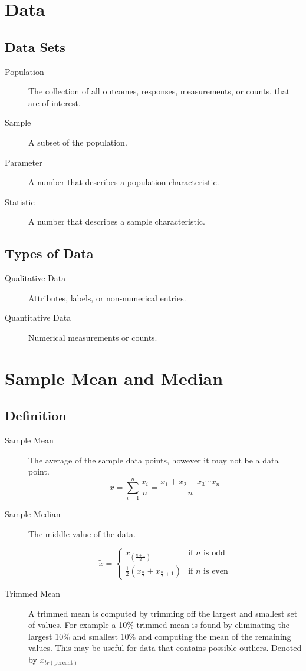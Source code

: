 \documentclass{book}
\begin{document}
\section{Data}

\subsection{Data Sets}
\begin{description}
\item[Population] The collection of all outcomes, responses, measurements, or counts, that are of interest.

\item[Sample] A subset of the population.

\item[Parameter] A number that describes a population characteristic.

\item[Statistic] A number that describes a sample characteristic.
\end{description}

\subsection{Types of Data}

\begin{description}
\item[Qualitative Data] Attributes, labels, or non-numerical entries.

\item[Quantitative Data] Numerical measurements or counts.
\end{description}

\section{Sample Mean and Median}

\subsection{Definition}
\begin{description}
\item[Sample Mean] The average of the sample data points, however it may not be a data point.
$$\overline{x} = \sum_{i=1}^n\frac{x_i}{n} = \frac{x_1+x_2+x_3\cdots x_n}{n}$$
\item[Sample Median] The middle value of the data.

$$\tilde{x}=\left\{
\begin{matrix}
x_{(\frac{n+1}{2})} & \text{if $n$ is odd}\\
\frac{1}{2}(x_{\frac{n}{2}}+x_{\frac{n}{2}+1}) & \text{if $n$ is even}
\end{matrix}
\right.$$

\item[Trimmed Mean] A trimmed mean is computed by trimming off the largest and smallest set of values. For example a 10\% trimmed mean is found by eliminating the largest 10\% and smallest 10\% and computing the mean of the remaining values. This may be useful for data that contains possible outliers. Denoted by $x_{tr(\text{percent})}$
\end{description}
\end{document}
